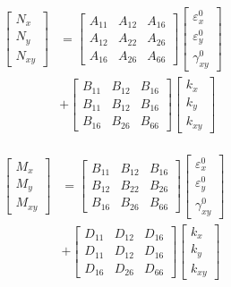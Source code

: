 \begin{equation} \label{eq:force_and_moments}
	\begin{array}{l}
		\begin{aligned}
	\begin{bmatrix}
		N_x \\
		N_y \\
		N_{xy}
	\end{bmatrix}
	&=
	\begin{bmatrix}
		A_{11} & A_{12} & A_{16} \\
		A_{12} & A_{22} & A_{26} \\
		A_{16} & A_{26} & A_{66} 
	\end{bmatrix}
    \begin{bmatrix}
		\varepsilon_x^0 \\
        \varepsilon_y^0 \\
		\gamma_{xy}^0
    \end{bmatrix}   \\
	&+               
	\begin{bmatrix}
		B_{11} & B_{12} & B_{16} \\
		B_{11} & B_{12} & B_{16} \\
		B_{16} & B_{26} & B_{66} 
	\end{bmatrix}
	\begin{bmatrix}
		k_x \\
		k_y \\
		k_{xy} 
	\end{bmatrix}  \\
\end{aligned} \\ \\
\begin{aligned}
	\begin{bmatrix}
		M_x \\
		M_y \\
		M_{xy}
	\end{bmatrix}
	&=
	\begin{bmatrix}
		B_{11} & B_{12} & B_{16} \\
		B_{12} & B_{22} & B_{26} \\
		B_{16} & B_{26} & B_{66} 
	\end{bmatrix}
    \begin{bmatrix}
		\varepsilon_x^0 \\
        \varepsilon_y^0 \\
		\gamma_{xy}^0
    \end{bmatrix} \\ 
	&+  
	\begin{bmatrix}
		D_{11} & D_{12} & D_{16} \\
		D_{11} & D_{12} & D_{16} \\
		D_{16} & D_{26} & D_{66} 
	\end{bmatrix}
	\begin{bmatrix}
		k_x \\
		k_y \\
		k_{xy} 
	\end{bmatrix}
\end{aligned}
	\end{array}
\end{equation}


